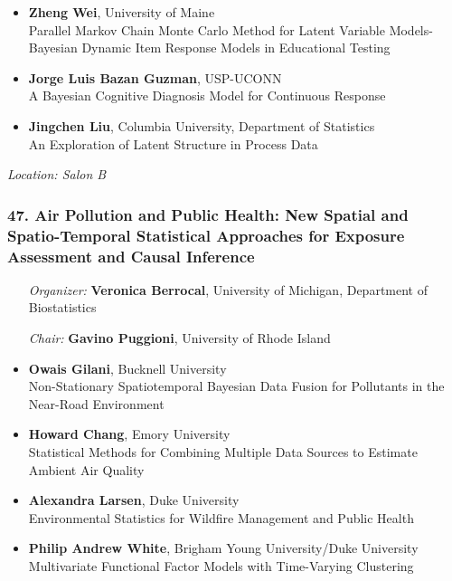 \begin{itemize}
\item \textbf{Zheng Wei}, University of Maine \\
Parallel Markov Chain Monte Carlo Method for Latent Variable Models-Bayesian Dynamic Item Response Models in Educational Testing
\item \textbf{Jorge Luis Bazan Guzman}, USP-UCONN \\
A Bayesian Cognitive Diagnosis Model for Continuous Response
\item \textbf{Jingchen Liu}, Columbia University, Department of Statistics \\
An Exploration of Latent Structure in Process Data
\end{itemize}

\emph{Location: Salon B}

\subsubsection*{47. Air Pollution and Public Health: New Spatial and Spatio-Temporal Statistical Approaches for Exposure Assessment and Causal Inference}

\begin{enumerate}[align=left]
\item [\emph{Organizer:}] \textbf{Veronica Berrocal}, University of Michigan, Department of Biostatistics
\item [\emph{Chair:}] \textbf{Gavino Puggioni},  University of Rhode Island
\end{enumerate}

\begin{itemize}
\item \textbf{Owais Gilani}, Bucknell University \\
Non-Stationary Spatiotemporal Bayesian Data Fusion for Pollutants in the Near-Road Environment
\item \textbf{Howard Chang}, Emory University \\
Statistical Methods for Combining Multiple Data Sources to Estimate Ambient Air Quality
\item \textbf{Alexandra Larsen}, Duke University \\
Environmental Statistics for Wildfire Management and Public Health
\item \textbf{Philip Andrew White}, Brigham Young University/Duke University \\
Multivariate Functional Factor Models with Time-Varying Clustering
\end{itemize}

